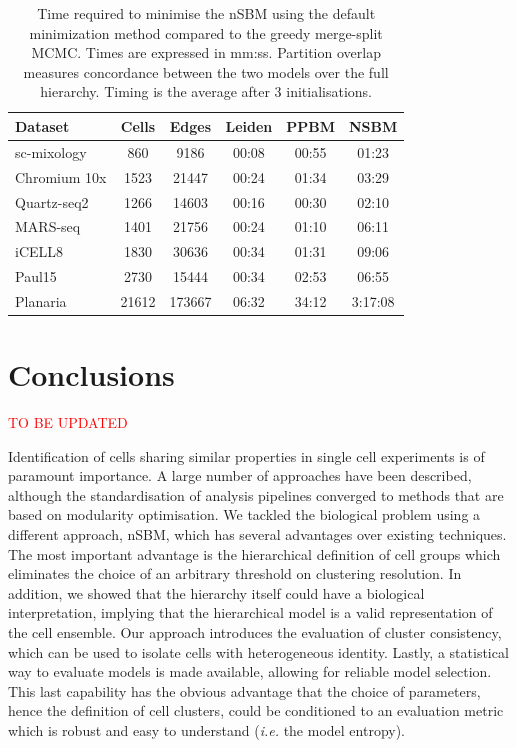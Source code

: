 \documentclass[10pt]{article}
\begin{document}
\begin{table}[h!]
\centering
 \begin{tabular}{|| l c c c c c ||}
 \hline
 \textbf{Dataset} & \textbf{Cells} & \textbf{Edges} & \textbf{Leiden} & \textbf{PPBM} & \textbf{NSBM} \\ [0.5ex] 
 \hline\hline
 sc-mixology \cite{Tian_2019} & 860 & 9186 & 00:08 & 00:55 & 01:23 \\ 
 \hline
 Chromium 10x \cite{mereu_2020} & 1523 & 21447 & 00:24 & 01:34 & 03:29\\ 
 \hline
 Quartz-seq2 \cite{mereu_2020} & 1266 & 14603 & 00:16 & 00:30 & 02:10 \\
 \hline
 MARS-seq \cite{mereu_2020} & 1401 & 21756 & 00:24 & 01:10 & 06:11 \\
 \hline
 iCELL8 \cite{mereu_2020} & 1830 & 30636 & 00:34 & 01:31 & 09:06 \\
 \hline
 Paul15 \cite{paul_2015} & 2730 & 15444 & 00:34 & 02:53 & 06:55\\ 
 \hline
 Planaria \cite{plass_2018} & 21612 & 173667 & 06:32 & 34:12 & 3:17:08 \\
 \hline
\end{tabular}
\caption{Time required to minimise the nSBM using the default minimization method compared to the greedy merge-split MCMC. Times are expressed in mm:ss. Partition overlap measures concordance between the two models over the full hierarchy. Timing is the average after 3 initialisations.}
\label{Table1}
\end{table}

\section*{Conclusions}
\textcolor{red}{TO BE UPDATED}

Identification of cells sharing similar properties in single cell experiments is of paramount importance. A large number of approaches have been described, although the standardisation of analysis pipelines converged to methods that are based on modularity optimisation. We tackled the biological problem using a different approach, nSBM, which has several advantages over existing techniques. The most important advantage is the hierarchical definition of cell groups which eliminates the choice of an arbitrary threshold on clustering resolution. In addition, we showed that the hierarchy itself could have a biological interpretation, implying that the hierarchical model is a valid representation of the cell ensemble. Our approach introduces the evaluation of cluster consistency, which can be used to isolate cells with heterogeneous identity. Lastly, a statistical way to evaluate models is made available, allowing for reliable model selection. This last capability has the obvious advantage that the choice of parameters, hence the definition of cell clusters, could be conditioned to an evaluation metric which is robust and easy to understand (\emph{i.e.} the model entropy).
\end{document}
